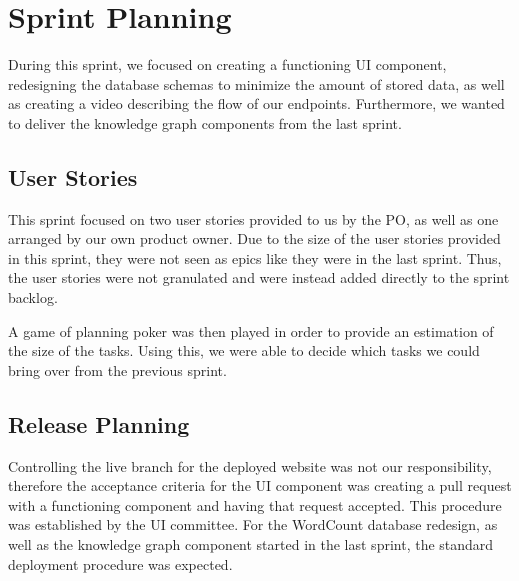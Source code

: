 \section{Sprint Planning}
During this sprint, we focused on creating a functioning UI component, redesigning the database schemas to minimize the amount of stored data, as well as creating a video describing the flow of our endpoints. Furthermore, we wanted to deliver the knowledge graph components from the last sprint. 

\subsection*{User Stories}
This sprint focused on two user stories provided to us by the \knox{} PO, as well as one arranged by our own product owner. 
Due to the size of the user stories provided in this sprint, they were not seen as epics like they were in the last sprint. Thus, the user stories were not granulated and were instead added directly to the sprint backlog.  


A game of planning poker was then played in order to provide an estimation of the size of the tasks. 
Using this, we were able to decide which tasks we could bring over from the previous sprint.

\subsection*{Release Planning}
Controlling the live branch for the deployed \knox{} website was not our responsibility, therefore the acceptance criteria for the UI component was creating a pull request with a functioning component and having that request accepted.
This procedure was established by the UI committee. 
For the WordCount database redesign, as well as the knowledge graph component started in the last sprint, the standard deployment procedure was expected. 